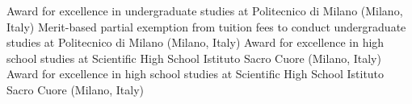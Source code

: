 \documentclass[
  a4paper, 
]{fortysecondscv}
\begin{document}
\begin{cvtable}
		{{\small Award for excellence in undergraduate studies at Politecnico di Milano (Milano, Italy)}}
		{{\small Merit-based partial exemption from tuition fees to conduct undergraduate studies at Politecnico di Milano (Milano, Italy)}}
		{{\small Award for excellence in high school studies at Scientific High School Istituto Sacro Cuore (Milano, Italy)}}
		{{\small Award for excellence in high school studies at Scientific High School Istituto Sacro Cuore (Milano, Italy)}}
\end{cvtable}
\end{document}

